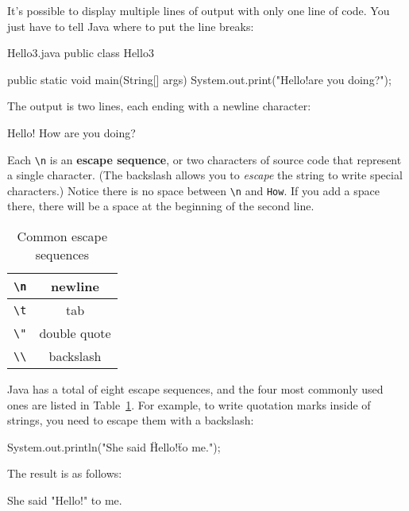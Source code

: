 It's possible to display multiple lines of output with only one line of code.
You just have to tell Java where to put the line breaks:

\begin{trinket}[220]{Hello3.java}
public class Hello3 {

    public static void main(String[] args) {
        System.out.print("Hello!\nHow are you doing?\n");
    }
}
\end{trinket}

The output is two lines, each ending with a newline character:

\begin{stdout}
Hello!
How are you doing?
\end{stdout}


Each \verb"\n" is an {\bf escape sequence}, or two characters of source code that represent a single character.
(The backslash allows you to {\em escape} the string to write special characters.)
Notice there is no space between \verb"\n" and \verb"How".
If you add a space there, there will be a space at the beginning of the second line.

\begin{table}[!ht]
\begin{center}
\begin{tabular}{|c|c|}
\hline
\verb"\n" & newline \\
\hline
\verb"\t" & tab \\
\hline
\verb'\"' & double quote \\
\hline
\verb"\\" & backslash \\
\hline
\end{tabular}
\caption{Common escape sequences}
\label{tab:escape}
\end{center}
\end{table}

Java has a total of eight escape sequences, and the four most commonly used ones are listed in Table~\ref{tab:escape}.
For example, to write quotation marks inside of strings, you need to escape them with a backslash:

\begin{code}
System.out.println("She said \"Hello!\" to me.");
\end{code}

The result is as follows:

\begin{stdout}
She said "Hello!" to me.
\end{stdout}


